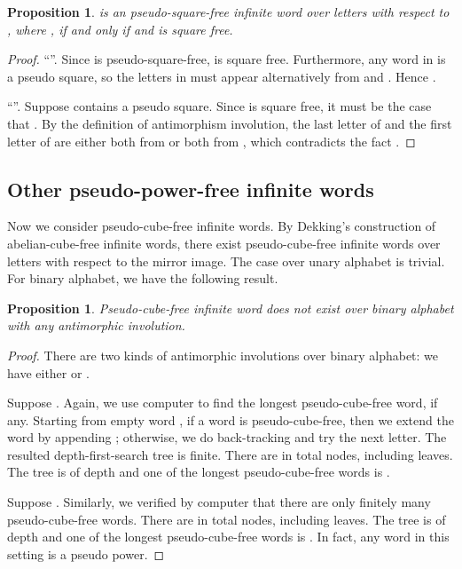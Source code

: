\documentclass[12pt]{article}
\newtheorem{proposition}[theorem]{Proposition}
\begin{document}
\begin{proposition}
 is an pseudo-square-free infinite word over  letters with
respect to , where
, if and
only if  and  is
square free.
\end{proposition}
\begin{proof}
``''.
Since  is pseudo-square-free,  is square free. Furthermore,
any word in  is a pseudo square, so the letters in
 must appear alternatively from  and . Hence
.

``''.
Suppose  contains a pseudo square. Since  is square free, it
must be the case that . By the definition of
antimorphism involution, the last letter of  and the first letter
of  are either both from  or both from ,
which contradicts the fact .
\end{proof}


\subsection{Other pseudo-power-free infinite words}
Now we consider pseudo-cube-free infinite words. By Dekking's
construction of abelian-cube-free infinite words, there exist
pseudo-cube-free infinite words over  letters with respect to the
mirror image. The case over unary alphabet is trivial. For binary
alphabet, we have the following result.


\begin{proposition}\label{prop:pseudocube}
Pseudo-cube-free infinite word does not exist over binary alphabet
with any antimorphic involution.
\end{proposition}
\begin{proof}
There are two kinds of antimorphic involutions over binary alphabet:
we have either  or
.

Suppose . Again, we use computer to find the longest
pseudo-cube-free word, if any. Starting from empty word ,
if a word is pseudo-cube-free, then we extend the word by appending
; otherwise, we do back-tracking and try the next letter. The
resulted depth-first-search tree is finite. There are in total 
nodes, including  leaves. The tree is of depth  and one of
the longest pseudo-cube-free words is
.

Suppose . Similarly, we verified
by computer that there are only finitely many pseudo-cube-free
words. There are in total  nodes, including  leaves. The tree
is of depth  and one of the longest pseudo-cube-free words is
. In fact, any word in this setting is a pseudo power.
\end{proof}
\end{document}
